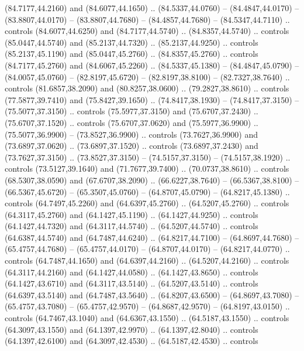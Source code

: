 \begin{scope}[cm={{1.25,0.0,0.0,-1.25,(-71.74049,81.13304)}}]
        (84.7177,44.2160) and (84.6077,44.1650) .. (84.5337,44.0760) --
        (84.4847,44.0170) -- (83.8807,44.0170) -- (83.8807,44.7680) --
        (84.4857,44.7680) -- (84.5347,44.7110) .. controls (84.6077,44.6250) and
        (84.7177,44.5740) .. (84.8357,44.5740) .. controls (85.0447,44.5740) and
        (85.2137,44.7320) .. (85.2137,44.9250) .. controls (85.2137,45.1190) and
        (85.0447,45.2760) .. (84.8357,45.2760) .. controls (84.7177,45.2760) and
        (84.6067,45.2260) .. (84.5337,45.1380) -- (84.4847,45.0790) --
        (84.0057,45.0760) -- (82.8197,45.6720) -- (82.8197,38.8100) --
        (82.7327,38.7640) .. controls (81.6857,38.2090) and (80.8257,38.0600) ..
        (79.2827,38.8610) .. controls (77.5877,39.7410) and (75.8427,39.1650) ..
        (74.8417,38.1930) -- (74.8417,37.3150) -- (75.5077,37.3150) .. controls
        (75.5977,37.3150) and (75.6707,37.2430) .. (75.6707,37.1520) .. controls
        (75.6707,37.0620) and (75.5977,36.9900) .. (75.5077,36.9900) --
        (73.8527,36.9900) .. controls (73.7627,36.9900) and (73.6897,37.0620) ..
        (73.6897,37.1520) .. controls (73.6897,37.2430) and (73.7627,37.3150) ..
        (73.8527,37.3150) -- (74.5157,37.3150) -- (74.5157,38.1920) .. controls
        (73.5127,39.1640) and (71.7677,39.7400) .. (70.0737,38.8610) .. controls
        (68.5307,38.0590) and (67.6707,38.2090) .. (66.6227,38.7640) --
        (66.5367,38.8100) -- (66.5367,45.6720) -- (65.3507,45.0760) --
        (64.8707,45.0790) -- (64.8217,45.1380) .. controls (64.7497,45.2260) and
        (64.6397,45.2760) .. (64.5207,45.2760) .. controls (64.3117,45.2760) and
        (64.1427,45.1190) .. (64.1427,44.9250) .. controls (64.1427,44.7320) and
        (64.3117,44.5740) .. (64.5207,44.5740) .. controls (64.6387,44.5740) and
        (64.7487,44.6240) .. (64.8217,44.7100) -- (64.8697,44.7680) --
        (65.4757,44.7680) -- (65.4757,44.0170) -- (64.8707,44.0170) --
        (64.8217,44.0770) .. controls (64.7487,44.1650) and (64.6397,44.2160) ..
        (64.5207,44.2160) .. controls (64.3117,44.2160) and (64.1427,44.0580) ..
        (64.1427,43.8650) .. controls (64.1427,43.6710) and (64.3117,43.5140) ..
        (64.5207,43.5140) .. controls (64.6397,43.5140) and (64.7487,43.5640) ..
        (64.8207,43.6500) -- (64.8697,43.7080) -- (65.4757,43.7080) --
        (65.4757,42.9570) -- (64.8687,42.9570) -- (64.8197,43.0150) .. controls
        (64.7467,43.1040) and (64.6367,43.1550) .. (64.5187,43.1550) .. controls
        (64.3097,43.1550) and (64.1397,42.9970) .. (64.1397,42.8040) .. controls
        (64.1397,42.6100) and (64.3097,42.4530) .. (64.5187,42.4530) .. controls

\end{scope}

